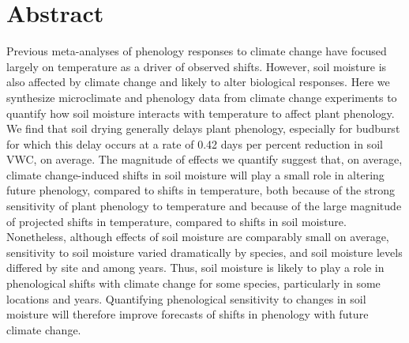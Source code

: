 \documentclass{article}
\begin{document}






\linenumbers
\section*{Abstract}
Previous meta-analyses of phenology responses to climate change have focused largely on temperature as a driver of observed shifts. However, soil moisture is also affected by climate change and likely to alter biological responses. Here we synthesize microclimate and phenology data from climate change experiments to quantify how soil moisture interacts with temperature to affect plant phenology. We find that soil drying generally delays plant phenology, especially for budburst for which this delay occurs at a rate of 0.42 days per percent reduction in soil VWC, on average. The magnitude of effects we quantify suggest that, on average, climate change-induced shifts in soil moisture will play a small role in altering future phenology, compared to shifts in temperature, both because of the strong sensitivity of plant phenology to temperature and because of the large magnitude of projected shifts in temperature, compared to shifts in soil moisture. Nonetheless, although effects of soil moisture are comparably small on average, sensitivity to soil moisture varied dramatically by species, and soil moisture levels differed by site and among years. Thus, soil moisture is likely to play a role in phenological shifts with climate change for some species, particularly in some locations and years. Quantifying phenological sensitivity to changes in soil moisture will therefore improve forecasts of shifts in phenology with future climate change.  

\newpage
\end{document}
